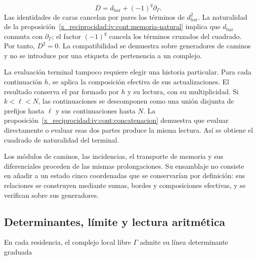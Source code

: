 \[
D=d_{\mathrm{bar}}+(-1)^q\partial_\Gamma.
\]
Las identidades de caras cancelan por pares los términos de \(d_{\mathrm{bar}}^2\). La naturalidad de la proposición~\ref{x_reciprocidad:iv:cont:memoria-natural} implica que \(d_{\mathrm{bar}}\) conmuta con \(\partial_\Gamma\); el factor \((-1)^q\) cancela los términos cruzados del cuadrado. Por tanto, \(D^2=0\). La compatibilidad se demuestra sobre generadores de caminos y no se introduce por una etiqueta de pertenencia a un complejo.

La evaluación terminal tampoco requiere elegir una historia particular. Para cada continuación \(h\), se aplica la composición efectiva de sus actualizaciones. El resultado conserva el par formado por \(h\) y su lectura, con su multiplicidad. Si \(k<\ell<N\), las continuaciones se descomponen como una unión disjunta de prefijos hasta \(\ell\) y sus continuaciones hasta \(N\). La proposición~\ref{x_reciprocidad:iv:cont:concatenacion} demuestra que evaluar directamente o evaluar esas dos partes produce la misma lectura. Así se obtiene el cuadrado de naturalidad del terminal.

Los módulos de caminos, las incidencias, el transporte de memoria y sus diferenciales proceden de las mismas prolongaciones. Su ensamblaje no consiste en añadir a un estado cinco coordenadas que se conservarían por definición: sus relaciones se construyen mediante sumas, bordes y composiciones efectivas, y se verifican sobre sus generadores.

\subsection{Determinantes, límite y lectura aritmética}
\label{x_reciprocidad:iv:cont:determinantes}
En cada residencia, el complejo local libre \(\Gamma\) admite su línea determinante graduada

